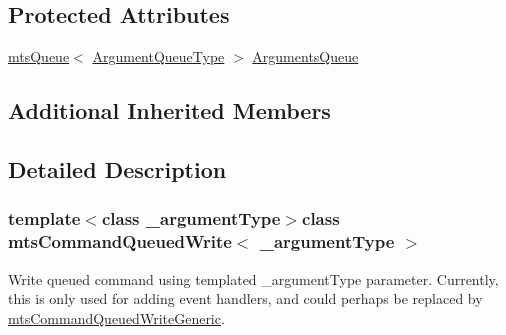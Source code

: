 \subsection*{Protected Attributes}
\begin{DoxyCompactItemize}
\item 
\hyperlink{classmts_queue}{mts\-Queue}$<$ \hyperlink{classmts_command_queued_write_a782b598b821585636a6a4f2039368b49}{Argument\-Queue\-Type} $>$ \hyperlink{classmts_command_queued_write_a863fbf2b7a850cdc9df55c9c55b5e4fd}{Arguments\-Queue}
\end{DoxyCompactItemize}
\subsection*{Additional Inherited Members}


\subsection{Detailed Description}
\subsubsection*{template$<$class \-\_\-argument\-Type$>$class mts\-Command\-Queued\-Write$<$ \-\_\-argument\-Type $>$}

Write queued command using templated \-\_\-argument\-Type parameter. Currently, this is only used for adding event handlers, and could perhaps be replaced by \hyperlink{classmts_command_queued_write_generic}{mts\-Command\-Queued\-Write\-Generic}. 

